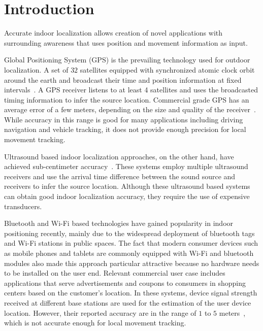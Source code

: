\chapter{Introduction}

Accurate indoor localization allows creation of novel applications with surrounding awareness that uses position and movement information as input. 

Global Positioning System (GPS) is the prevailing technology used for outdoor localization. A set of $32$ satellites equipped with synchronized atomic clock orbit around the earth and broadcast their time and position information at fixed intervals~\cite{intro:gps2}. A GPS receiver listens to at least 4 satellites and uses the broadcasted timing information to infer the source location. Commercial grade GPS has an average error of a few meters, depending on the size and quality of the receiver~\cite{intro:gps}. While accuracy in this range is good for many applications including driving navigation and vehicle tracking, it does not provide enough precision for local movement tracking. 

Ultrasound based indoor localization approaches, on the other hand, have achieved sub-centimeter accuracy~\cite{intro:ultra, intro:ultra2}. These systems employ multiple ultrasound receivers and use the arrival time difference between the sound source and receivers to infer the source location. Although these ultrasound based systems can obtain good indoor localization accuracy, they require the use of expensive transducers.

Bluetooth and Wi-Fi based technologies have gained popularity in indoor positioning recently, mainly due to the widespread deployment of bluetooth tags and Wi-Fi stations in public spaces. The fact that modern consumer devices such as mobile phones and tablets are commonly equipped with Wi-Fi and bluetooth modules also made this approach particular attractive because no hardware needs to be installed on the user end. Relevant commercial user case includes applications that serve advertisements and coupons to consumers in shopping centers based on the customer's location. In these systems, device signal strength received at different base stations are used for the estimation of the user device location. However, their reported accuracy are in the range of $1$ to $5$ meters~\cite{intro:blue, intro:loc, intro:wifi}, which is not accurate enough for local movement tracking.

